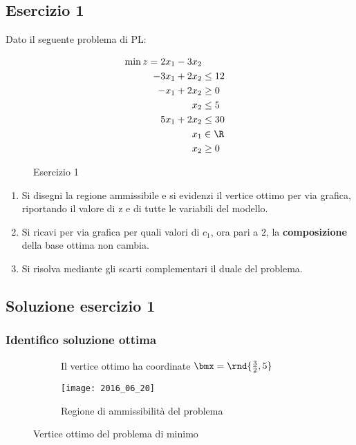 \documentclass[\main/main.tex]{subfiles}
\begin{document}
\subsection{Esercizio 1}
Dato il seguente problema di PL:

\begin{figure}
  \begin{align*}
    \min z = 2x_1 - 3x_2   \\
    -3x_1 + 2x_2 & \leq 12 \\
    -x_1 + 2x_2  & \geq 0  \\
    x_2          & \leq 5  \\
    5x_1 + 2x_2  & \leq 30 \\
    x_1          & \in \R  \\
    x_2          & \geq 0
  \end{align*}
  \caption{Esercizio 1}
\end{figure}

\begin{enumerate}
  \item Si disegni la regione ammissibile e si evidenzi il vertice ottimo per via grafica, riportando il valore di z e di tutte le variabili del modello.
  \item Si ricavi per via grafica per quali valori di $c_1$, ora pari a $2$, la \textbf{composizione} della base ottima non cambia.
  \item Si risolva mediante gli scarti complementari il duale del problema.
\end{enumerate}

\subsection{Soluzione esercizio 1}

\subsubsection*{Identifico soluzione ottima}

\begin{figure}
  \begin{subfigure}{0.49\textwidth}
    \caption{Il vertice ottimo ha coordinate $\bmx = \rnd{\frac{3}{2},5}$}
  \end{subfigure}
  \begin{subfigure}{0.49\textwidth}
    \texttt{[image: 2016\_06\_20]}
    \caption{Regione di ammissibilità del problema}
  \end{subfigure}
  \caption{Vertice ottimo del problema di minimo}
\end{figure}
\end{document}
